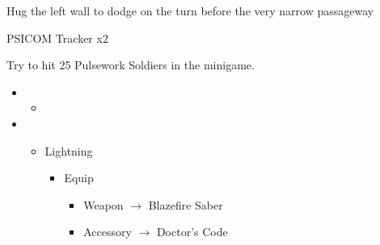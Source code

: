 \documentclass{report}
\begin{document}
Hug the left wall to dodge on the turn before the very narrow passageway

\begin{battle}{PSICOM Tracker x2}
 
\end{battle}

Try to hit 25 Pulsework Soldiers in the minigame.



\begin{menu}
\begin{itemize}
    \item \paradigm
    \begin{itemize}
        \item {}%
{\paradigmline{\com}{\rav}{}}%
{\paradigmline{\textit{\com}}{\textit{\syn}}{}}%
{\paradigmline{\med}{\med}{}}%
{\paradigmline{\rav}{\rav}{}}%
{\paradigmline{\rav}{\rav}{}}%
    \end{itemize}
    \item \equip
    \begin{itemize}
        \item Lightning
        \begin{itemize}
            \item Equip
            \begin{itemize}
                \item Weapon $\rightarrow$ Blazefire Saber
                \item Accessory $\rightarrow$ Doctor's Code
            \end{itemize}
        \end{itemize}
    \end{itemize}
\end{itemize}
\end{menu}
\end{document}
